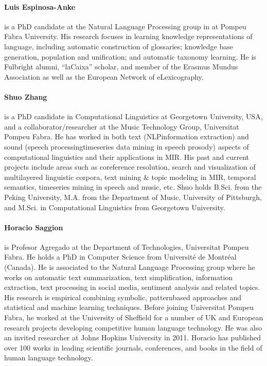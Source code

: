{\paragraph{Luis Espinosa-Anke} is a PhD candidate at the Natural Language Processing group in at Pompeu Fabra University. His research focuses in learning knowledge representations of language, including automatic construction of glossaries; knowledge base generation, population and unification; and automatic taxonomy learning. He is Fulbright alumni, “laCaixa” scholar, and member of the Erasmus Mundus Association as well as the European Network of eLexicography.

\paragraph{Shuo Zhang} is a PhD candidate in Computational Linguistics at Georgetown University, USA, and a collaborator/researcher at the Music Technology Group, Universitat Pompeu Fabra. He has worked in both text (NLP­information extraction) and sound (speech processing­time­series data mining in speech prosody) aspects of computational linguistics and their applications in MIR. His past and current projects include areas such as coreference resolution, search and visualization of multilayered linguistic corpora, text mining \& topic modeling in MIR, temporal semantics, time­series mining in speech and music, etc. Shuo holds B.Sci. from the Peking University, M.A. from the Department of Music, University of Pittsburgh, and M.Sci. in Computational Linguistics from Georgetown University.

\paragraph{Horacio Saggion} is Profesor Agregado at the Department of Technologies, Universitat Pompeu Fabra. He holds a PhD in Computer Science from Université de Montréal (Canada). He is associated to the Natural Language Processing group where he works on automatic text summarization, text simplification, information extraction, text processing in social media, sentiment analysis and related topics. His research is empirical combining symbolic, pattern­based approaches and statistical and machine learning techniques. Before joining Universitat Pompeu Fabra, he worked at the University of Sheffield for a number of UK and European research projects developing competitive human language technology. He was also an invited researcher at Johns Hopkins University in 2011. Horacio has published over 100 works in leading scientific journals, conferences, and books in the field of human language technology.}

